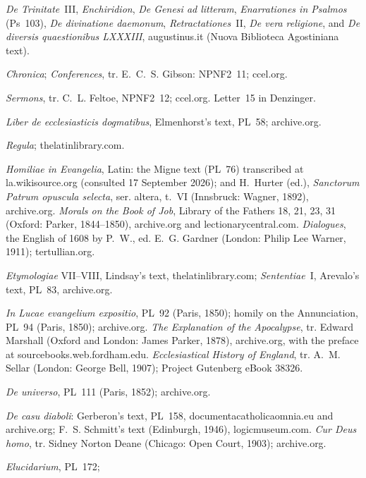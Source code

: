 \begin{description}
  \emph{De Trinitate}~III, \emph{Enchiridion}, \emph{De Genesi ad
  litteram}, \emph{Enarrationes in Psalmos} (Ps~103), \emph{De divinatione
  daemonum}, \emph{Retractationes}~II, \emph{De vera religione}, and
  \emph{De diversis quaestionibus LXXXIII}, augustinus.it (Nuova
  Biblioteca Agostiniana text).
\item[Sulpicius Severus; John Cassian.] \emph{Chronica}; \emph{Conferences},
  tr. E.~C.~S. Gibson: NPNF2~11; ccel.org.
\item[Leo the Great.] \emph{Sermons}, tr. C.~L. Feltoe, NPNF2~12; ccel.org.
  Letter~15 in Denzinger.
\item[Gennadius of Marseilles.] \emph{Liber de ecclesiasticis dogmatibus},
  Elmenhorst's text, PL~58; archive.org.
\item[Benedict of Nursia.] \emph{Regula}; thelatinlibrary.com.
\item[Gregory the Great.] \emph{Homiliae in Evangelia}, Latin: the Migne
  text (PL~76) transcribed at la.wikisource.org (consulted 17 September
  2026); and H.~Hurter (ed.), \emph{Sanctorum Patrum opuscula
  selecta}, ser. altera, t.~VI (Innsbruck: Wagner, 1892), archive.org.
  \emph{Morals on the Book of Job}, Library of the Fathers 18, 21, 23, 31
  (Oxford: Parker, 1844--1850), archive.org and lectionarycentral.com.
  \emph{Dialogues}, the English of 1608 by P.~W., ed. E.~G. Gardner
  (London: Philip Lee Warner, 1911); tertullian.org.
\item[Isidore of Seville.] \emph{Etymologiae} VII--VIII, Lindsay's text,
  thelatinlibrary.com; \emph{Sententiae}~I, Arevalo's text, PL~83,
  archive.org.
\item[Bede.] \emph{In Lucae evangelium expositio}, PL~92 (Paris, 1850);
  homily on the Annunciation, PL~94 (Paris, 1850); archive.org.
  \emph{The Explanation of the Apocalypse}, tr. Edward Marshall (Oxford and
  London: James Parker, 1878), archive.org, with the preface at
  sourcebooks.web.fordham.edu. \emph{Ecclesiastical History of England},
  tr. A.~M. Sellar (London: George Bell, 1907); Project Gutenberg eBook
  38326.
\item[Rabanus Maurus.] \emph{De universo}, PL~111 (Paris, 1852);
  archive.org.
\item[Anselm.] \emph{De casu diaboli}: Gerberon's text, PL~158,
  \mbox{documentacatholicaomnia.eu} and archive.org; F.~S. Schmitt's text
  (Edinburgh, 1946), logicmuseum.com. \emph{Cur Deus homo}, tr. Sidney
  Norton Deane (Chicago: Open Court, 1903); archive.org.
\item[Honorius Augustodunensis.] \emph{Elucidarium}, PL~172;

\end{description}
